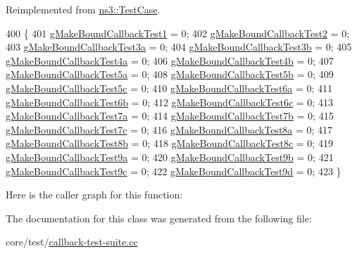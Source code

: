 Reimplemented from \hyperlink{classns3_1_1TestCase_a4a7e32ad32a10a508910815cd38e9177}{ns3\+::\+Test\+Case}.


\begin{DoxyCode}
400 \{
401   \hyperlink{callback-test-suite_8cc_a3d1ab60494f3dec0f04a96e1a159929e}{gMakeBoundCallbackTest1} = 0;
402   \hyperlink{callback-test-suite_8cc_a1caffc0c35f737606a8f10bd508dd0b9}{gMakeBoundCallbackTest2} = 0;
403   \hyperlink{callback-test-suite_8cc_a4823c46db6aa3f6dc6f22d469530282b}{gMakeBoundCallbackTest3a} = 0;
404   \hyperlink{callback-test-suite_8cc_a89a5cbdc689d0e2873c1bdd0a02b911c}{gMakeBoundCallbackTest3b} = 0;
405   \hyperlink{callback-test-suite_8cc_adcdcedb8a5a0b5b8510241d9234bc437}{gMakeBoundCallbackTest4a} = 0;
406   \hyperlink{callback-test-suite_8cc_a6356e7aca7e7548fa5e66937402bc97b}{gMakeBoundCallbackTest4b} = 0;
407   \hyperlink{callback-test-suite_8cc_a13d61f210cc232207f749f18adbeac68}{gMakeBoundCallbackTest5a} = 0;
408   \hyperlink{callback-test-suite_8cc_a73d2d3738711a7ffa020bd2f9a6047f6}{gMakeBoundCallbackTest5b} = 0;
409   \hyperlink{callback-test-suite_8cc_a80c93f22789b8a166ab7261010f6ce83}{gMakeBoundCallbackTest5c} = 0;
410   \hyperlink{callback-test-suite_8cc_a80c930d6600e3ec5df67a4f96c82bc08}{gMakeBoundCallbackTest6a} = 0;
411   \hyperlink{callback-test-suite_8cc_a28424166f0abaca2b5859849a24ff160}{gMakeBoundCallbackTest6b} = 0;
412   \hyperlink{callback-test-suite_8cc_a4f5ef2a5a13748e5c4235f991d134a64}{gMakeBoundCallbackTest6c} = 0;
413   \hyperlink{callback-test-suite_8cc_a5e1517ba472cb373d210f6c4bf650774}{gMakeBoundCallbackTest7a} = 0;
414   \hyperlink{callback-test-suite_8cc_a2fb964f8eaa6d045940c6b483930d1ed}{gMakeBoundCallbackTest7b} = 0;
415   \hyperlink{callback-test-suite_8cc_a18bc2f4e64af63bb92d7ea129cee841f}{gMakeBoundCallbackTest7c} = 0;
416   \hyperlink{callback-test-suite_8cc_afa2dde26eb4eaba1ab619cca192e69b0}{gMakeBoundCallbackTest8a} = 0;
417   \hyperlink{callback-test-suite_8cc_aa7b516443d299bb17a157ccff02e4f1e}{gMakeBoundCallbackTest8b} = 0;
418   \hyperlink{callback-test-suite_8cc_ae36d0de967cac6dfce6c7cb5d82a0f34}{gMakeBoundCallbackTest8c} = 0;
419   \hyperlink{callback-test-suite_8cc_a364c841620e810ce54feed3c02bfc44d}{gMakeBoundCallbackTest9a} = 0;
420   \hyperlink{callback-test-suite_8cc_a5343074ba158ded308eb54ae42f5f9b1}{gMakeBoundCallbackTest9b} = 0;
421   \hyperlink{callback-test-suite_8cc_af40ff68587a2a87943fdedad6c0cb130}{gMakeBoundCallbackTest9c} = 0;
422   \hyperlink{callback-test-suite_8cc_accb9e8c0a669d5e464627b352f740474}{gMakeBoundCallbackTest9d} = 0;
423 \}
\end{DoxyCode}


Here is the caller graph for this function\+:




The documentation for this class was generated from the following file\+:\begin{DoxyCompactItemize}
\item 
core/test/\hyperlink{callback-test-suite_8cc}{callback-\/test-\/suite.\+cc}\end{DoxyCompactItemize}
